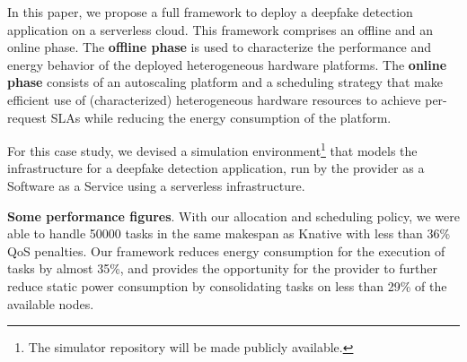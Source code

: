 In this paper, we propose a full framework to deploy a deepfake detection application on a serverless cloud. This framework comprises an offline and an online phase. The \textbf{offline phase} is used to characterize the performance and energy behavior of the deployed heterogeneous hardware platforms. The \textbf{online phase} consists of an autoscaling platform and a scheduling strategy that make efficient use of (characterized) heterogeneous hardware resources to achieve per-request SLAs while reducing the energy consumption of the platform. 



For this case study, we devised a simulation environment\footnote{The simulator repository will be made publicly available.} that models the infrastructure for a deepfake detection application, run by the provider as a Software as a Service using a serverless infrastructure.   %


\textbf{Some performance figures}. With our allocation and scheduling policy, we were able to handle 50000 tasks in the same makespan as Knative with less than 36\% QoS penalties. Our framework reduces energy consumption for the execution of tasks by almost 35\%, and provides the opportunity for the provider to further reduce static power consumption by consolidating tasks on less than 29\% of the available nodes.

